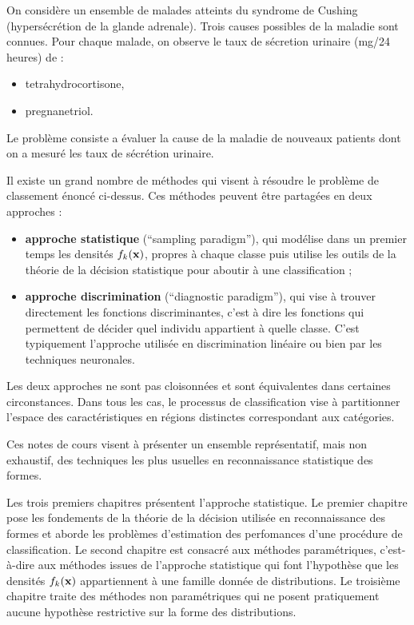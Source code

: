 \begin{ex} \cite{Ripley1996}
On consid\`ere un ensemble de malades atteints du 
syndrome de Cushing (hypers\'ecr\'etion de la glande adrenale).
Trois causes possibles de la maladie sont connues. Pour chaque malade, 
on observe le taux de s\'ecretion urinaire (mg/24 heures) de :
\begin{itemize}
\item tetrahydrocortisone,
\item pregnanetriol.
\end{itemize}
Le probl\`eme consiste a \'evaluer la cause de la maladie de nouveaux patients
dont on a mesur\'e les taux de s\'ecr\'etion urinaire.
\end{ex}


Il existe un grand nombre de m\'ethodes qui visent \`a r\'esoudre
le probl\`eme de classement \'enonc\'e ci-dessus. Ces m\'ethodes peuvent
\^etre partag\'ees en deux approches :
\begin{itemize}
\item {\bf approche statistique} (``sampling paradigm''), qui mod\'elise dans un premier temps 
les densit\'es $f_k(\mbox{\bf x})$, propres \`a chaque classe  puis utilise les outils de la th\'eorie de 
la d\'ecision statistique pour aboutir \`a une classification ;
\item {\bf approche discrimination} (``diagnostic paradigm''), qui vise \`a trouver directement 
les fonctions discriminantes, c'est \`a dire les fonctions qui permettent de d\'ecider 
quel individu appartient \`a quelle classe. C'est typiquement l'approche 
utilis\'ee en discrimination lin\'eaire ou bien par les techniques
neuronales.
\end{itemize}
Les deux approches ne sont pas cloisonn\'ees et sont \'equivalentes
dans certaines circonstances.
Dans tous les cas, le processus de classification vise \`a 
partitionner l'espace des  caract\'eristiques en r\'egions distinctes 
correspondant aux cat\'egories.

Ces notes de cours visent \`a pr\'esenter un ensemble repr\'esentatif, mais
non exhaustif, des techniques les plus usuelles en reconnaissance 
statistique des formes. 

Les trois premiers chapitres pr\'esentent l'approche statistique. Le premier
chapitre pose les fondements de la th\'eorie de la d\'ecision utilis\'ee
en reconnaissance des formes et aborde les probl\`emes d'estimation 
des perfomances d'une proc\'edure de classification. Le second chapitre
est consacr\'e aux m\'ethodes param\'etriques, c'est-\`a-dire aux m\'ethodes
issues de l'approche statistique qui font l'hypoth\`ese que les densit\'es
$f_k(\mbox{\bf x})$ appartiennent \`a une famille donn\'ee de distributions. Le troisi\`eme
chapitre traite des m\'ethodes non param\'etriques qui ne posent pratiquement
aucune hypoth\`ese restrictive sur la forme des distributions.


